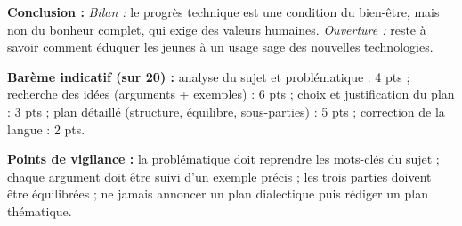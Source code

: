 \documentclass[11pt]{article}
\begin{document}
\begin{corrige}
\begin{enumerate}
\textbf{Conclusion :} \emph{Bilan :} le progrès technique est une condition du bien-être, mais non du bonheur complet, qui exige des valeurs humaines. \emph{Ouverture :} reste à savoir comment éduquer les jeunes à un usage sage des nouvelles technologies.
\end{enumerate}

\textbf{Barème indicatif (sur 20) :} analyse du sujet et problématique : 4 pts ; recherche des idées (arguments + exemples) : 6 pts ; choix et justification du plan : 3 pts ; plan détaillé (structure, équilibre, sous-parties) : 5 pts ; correction de la langue : 2 pts.

\textbf{Points de vigilance :} la problématique doit reprendre les mots-clés du sujet ; chaque argument doit être suivi d'un exemple précis ; les trois parties doivent être équilibrées ; ne jamais annoncer un plan dialectique puis rédiger un plan thématique.
\end{corrige}
\end{document}
